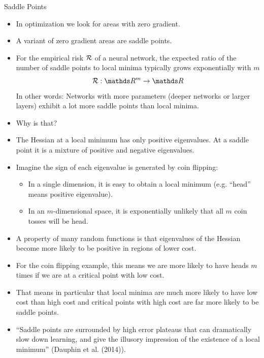 \documentclass[11pt,compress,t,notes=noshow, xcolor=table]{beamer}
\begin{document}
\begin{vbframe}{Saddle Points}
  \begin{itemize}
    \item In optimization we look for areas with zero gradient.
    \item A variant of zero gradient areas are saddle points.
    \item For the empirical risk $\mathcal{R}$ of a neural network, the expected ratio of the number of saddle points to local minima typically grows exponentially with $m$ 
    $$\risk: \R^m \rightarrow \R$$ 
    In other words: Networks with more parameters (deeper networks or larger layers) exhibit a lot more saddle points than local minima.
     \item Why is that?
    \item The Hessian at a local minimum has only positive eigenvalues. At a saddle point it is a mixture of positive and negative eigenvalues.
    
\framebreak
    
    \item Imagine the sign of each eigenvalue is generated by coin flipping:
    \begin{itemize}
      \item In a single dimension, it is easy to obtain a local minimum (e.g. \enquote{head} means positive eigenvalue).
      \item In an $m$-dimensional space, it is exponentially unlikely that all $m$ coin tosses will be head.
    \end{itemize}
    \item A property of many random functions is that eigenvalues of the Hessian become more likely to be positive in regions of lower cost.
    \item For the coin flipping example, this means we are more likely to have heads $m$ times if we are at a critical point with low cost.
    \item That means in particular that local minima are much more likely to have low cost than high cost and critical points with high cost are far more likely to be saddle points.

    \item \enquote{Saddle points are surrounded by high error plateaus that can dramatically slow down learning, and give the illusory impression of the existence of a local minimum} (Dauphin et al. (2014)).
    
    
  \end{itemize}
\end{vbframe}

\endlecture
\end{document}
